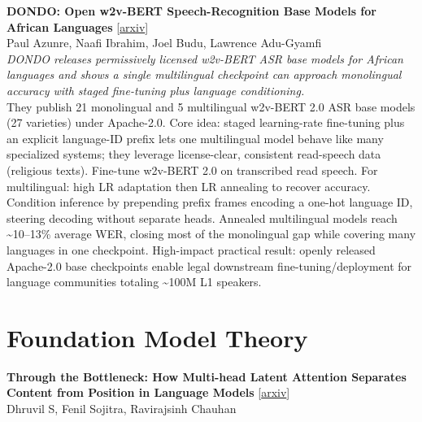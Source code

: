 \documentclass[12pt,letterpaper]{article}
\begin{document}
\medskip

{\small\textbf{DONDO: Open w2v-BERT Speech-Recognition Base Models for African Languages}} {\scriptsize[\href{https://arxiv.org/abs/2607.21540}{arxiv}]}\\
{\scriptsize Paul Azunre, Naafi Ibrahim, Joel Budu, Lawrence Adu-Gyamfi}\\

{\small\textit{DONDO releases permissively licensed w2v-BERT ASR base models for African languages and shows a single multilingual checkpoint can approach monolingual accuracy with staged fine-tuning plus language conditioning.}}\\[1pt]
{\footnotesize They publish 21 monolingual and 5 multilingual w2v-BERT 2.0 ASR base models (27 varieties) under Apache-2.0. Core idea: staged learning-rate fine-tuning plus an explicit language-ID prefix lets one multilingual model behave like many specialized systems; they leverage license-clear, consistent read-speech data (religious texts). Fine-tune w2v-BERT 2.0 on transcribed read speech. For multilingual: high LR adaptation then LR annealing to recover accuracy. Condition inference by prepending prefix frames encoding a one-hot language ID, steering decoding without separate heads. Annealed multilingual models reach \textasciitilde{}10--13\% average WER, closing most of the monolingual gap while covering many languages in one checkpoint. High-impact practical result: openly released Apache-2.0 base checkpoints enable legal downstream fine-tuning/deployment for language communities totaling \textasciitilde{}100M L1 speakers.}

\medskip


\section*{Foundation Model Theory}

{\small\textbf{Through the Bottleneck: How Multi-head Latent Attention Separates Content from Position in Language Models}} {\scriptsize[\href{https://arxiv.org/abs/2607.23054}{arxiv}]}\\
{\scriptsize Dhruvil S, Fenil Sojitra, Ravirajsinh Chauhan}\\
\end{document}
